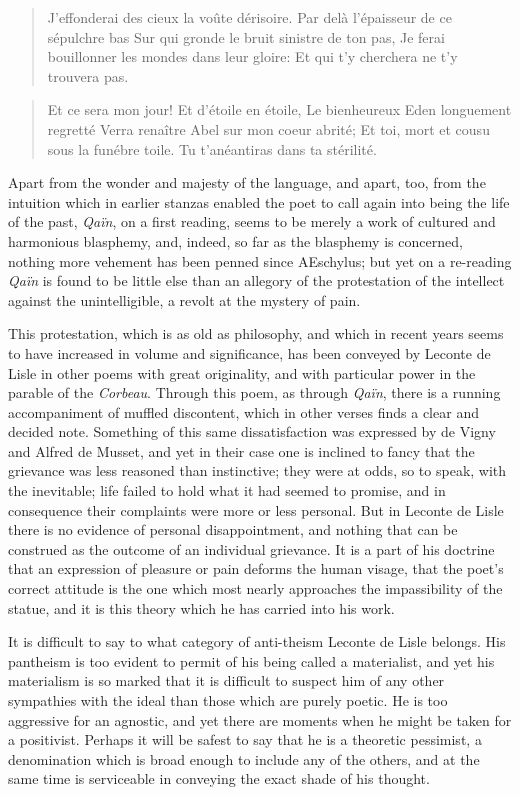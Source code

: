\documentclass[]{book}
\begin{document}
\begin{quote}
J'effonderai des cieux la voûte dérisoire. Par delà l'épaisseur de ce
sépulchre bas Sur qui gronde le bruit sinistre de ton pas, Je ferai
bouillonner les mondes dans leur gloire: Et qui t'y cherchera ne t'y
trouvera pas.
\end{quote}

\begin{quote}
Et ce sera mon jour! Et d'étoile en étoile, Le bienheureux Eden
longuement regretté Verra renaître Abel sur mon coeur abrité; Et toi,
mort et cousu sous la funébre toile. Tu t'anéantiras dans ta stérilité.
\end{quote}

Apart from the wonder and majesty of the language, and apart, too, from
the intuition which in earlier stanzas enabled the poet to call again
into being the life of the past, \emph{Qaïn}, on a first reading, seems
to be merely a work of cultured and harmonious blasphemy, and, indeed,
so far as the blasphemy is concerned, nothing more vehement has been
penned since AEschylus; but yet on a re-reading \emph{Qaïn} is found to
be little else than an allegory of the protestation of the intellect
against the unintelligible, a revolt at the mystery of pain.

This protestation, which is as old as philosophy, and which in recent
years seems to have increased in volume and significance, has been
conveyed by Leconte de Lisle in other poems with great originality, and
with particular power in the parable of the \emph{Corbeau}. Through this
poem, as through \emph{Qaïn}, there is a running accompaniment of
muffled discontent, which in other verses finds a clear and decided
note. Something of this same dissatisfaction was expressed by de Vigny
and Alfred de Musset, and yet in their case one is inclined to fancy
that the grievance was less reasoned than instinctive; they were at
odds, so to speak, with the inevitable; life failed to hold what it had
seemed to promise, and in consequence their complaints were more or less
personal. But in Leconte de Lisle there is no evidence of personal
disappointment, and nothing that can be construed as the outcome of an
individual grievance. It is a part of his doctrine that an expression of
pleasure or pain deforms the human visage, that the poet's correct
attitude is the one which most nearly approaches the impassibility of
the statue, and it is this theory which he has carried into his work.

It is difficult to say to what category of anti-theism Leconte de Lisle
belongs. His pantheism is too evident to permit of his being called a
materialist, and yet his materialism is so marked that it is difficult
to suspect him of any other sympathies with the ideal than those which
are purely poetic. He is too aggressive for an agnostic, and yet there
are moments when he might be taken for a positivist. Perhaps it will be
safest to say that he is a theoretic pessimist, a denomination which is
broad enough to include any of the others, and at the same time is
serviceable in conveying the exact shade of his thought.
\end{document}
